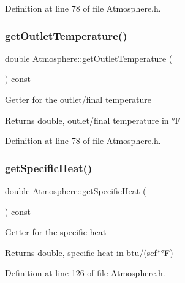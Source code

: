 Definition at line 78 of file Atmosphere.\+h.

\mbox{\label{class_atmosphere_a717e2dc78ebd13420f8f26707374dd3f}} 
\subsubsection{\texorpdfstring{get\+Outlet\+Temperature()}{getOutletTemperature()}\hspace{0.1cm}{\footnotesize\ttfamily [3/3]}}
{\footnotesize\ttfamily double Atmosphere\+::get\+Outlet\+Temperature (\begin{DoxyParamCaption}{ }\end{DoxyParamCaption}) const\hspace{0.3cm}{\ttfamily [inline]}}

Getter for the outlet/final temperature \begin{DoxyReturn}{Returns}
double, outlet/final temperature in °F 
\end{DoxyReturn}


Definition at line 78 of file Atmosphere.\+h.

\mbox{\label{class_atmosphere_a59802a10861a58ab0f0f4e0ab8671e14}} 
\subsubsection{\texorpdfstring{get\+Specific\+Heat()}{getSpecificHeat()}\hspace{0.1cm}{\footnotesize\ttfamily [1/3]}}
{\footnotesize\ttfamily double Atmosphere\+::get\+Specific\+Heat (\begin{DoxyParamCaption}{ }\end{DoxyParamCaption}) const\hspace{0.3cm}{\ttfamily [inline]}}

Getter for the specific heat \begin{DoxyReturn}{Returns}
double, specific heat in btu/(scf$\ast$°F) 
\end{DoxyReturn}


Definition at line 126 of file Atmosphere.\+h.

